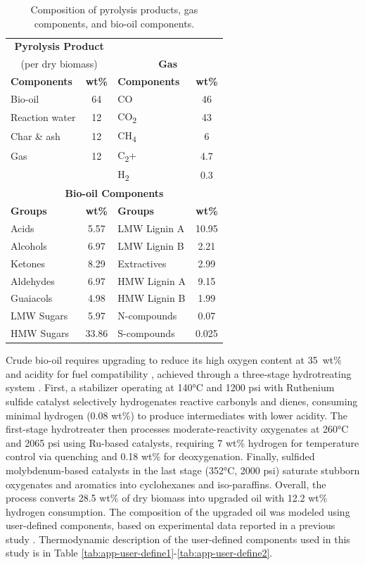 \documentclass[11pt]{article}
\begin{document}
\begin{table}[htbp]
\centering
\caption{Composition of pyrolysis products, gas components, and bio-oil components.}
\begin{tabular}{lc||lc}
\toprule
\multicolumn{2}{c||}{\textbf{Pyrolysis Product}} & \multicolumn{2}{c}{\textbf{}} \\
\multicolumn{2}{c||}{(per dry biomass)} & \multicolumn{2}{c}{\textbf{Gas}} \\
\hline
\textbf{Components} & \textbf{wt\%} & \textbf{Components} & \textbf{wt\%}\\
\hline
Bio-oil & 64 & CO & 46 \\
Reaction water & 12 & CO\textsubscript{2} & 43 \\
Char \& ash & 12 & CH\textsubscript{4} & 6 \\
Gas & 12 & C\textsubscript{2}+ & 4.7 \\
& & H\textsubscript{2} & 0.3 \\
\midrule
\multicolumn{4}{c}{\textbf{Bio-oil Components}} \\
\hline
\textbf{Groups} & \textbf{wt\%} & \textbf{Groups} & \textbf{wt\%}\\
\hline
Acids & 5.57 & LMW Lignin A & 10.95 \\
Alcohols & 6.97 & LMW Lignin B & 2.21 \\
Ketones & 8.29 & Extractives & 2.99 \\
Aldehydes & 6.97 & HMW Lignin A & 9.15 \\
Guaiacols & 4.98 & HMW Lignin B & 1.99 \\
LMW Sugars & 5.97 & N-compounds & 0.07 \\
HMW Sugars & 33.86 & S-compounds & 0.025 \\
\bottomrule
\end{tabular}
\label{tab:pyro-prod}
\end{table}

Crude bio-oil requires upgrading to reduce its high oxygen content at 35~wt\% and acidity for fuel compatibility \cite{elliott2007historical}, achieved through a three-stage hydrotreating system \cite{elliott2016transportation}. First, a stabilizer operating at 140°C and 1200 psi with Ruthenium sulfide catalyst selectively hydrogenates reactive carbonyls and dienes, consuming minimal hydrogen (0.08 wt\%) to produce intermediates with lower acidity. The first-stage hydrotreater then processes moderate-reactivity oxygenates at 260°C and 2065 psi using Ru-based catalysts, requiring 7 wt\% hydrogen for temperature control via quenching and 0.18 wt\% for deoxygenation. Finally, sulfided molybdenum-based catalysts in the last stage (352°C, 2000 psi) saturate stubborn oxygenates and aromatics into cyclohexanes and iso-paraffins. Overall, the process converts 28.5 wt\% of dry biomass into upgraded oil with 12.2 wt\% hydrogen consumption. The composition of the upgraded oil was modeled  using user-defined components, based on experimental data reported in a previous study \cite{jones2013process}. Thermodynamic description of the user-defined components used in this study is in Table \ref{tab:app-user-define1}-\ref{tab:app-user-define2}.
\end{document}

